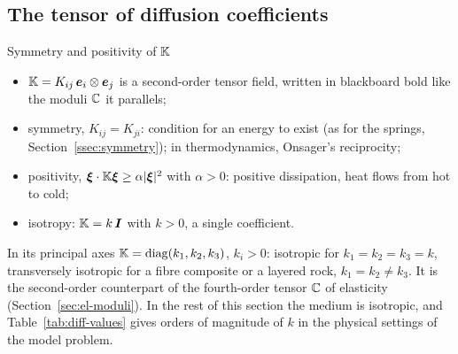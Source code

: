 \subsection{The tensor of diffusion coefficients}
%
\begin{gbox}{Symmetry and positivity of $\mathbb{K}$}
\begin{itemize}
  \item $\mathbb{K}=K_{ij}\,\bm{e}_i\otimes\bm{e}_j$ is a second-order tensor field,
  written in blackboard bold like the moduli $\mathbb{C}$ it parallels;
  \item symmetry, $K_{ij}=K_{ji}$: condition for an energy to exist (as for the
  springs, Section~\ref{ssec:symmetry}); in thermodynamics, Onsager's
  reciprocity;
  \item positivity, $\bm{\xi}\cdot\mathbb{K}\bm{\xi}\ge\alpha|\bm{\xi}|^2$ with $\alpha>0$: positive
  dissipation, heat flows from hot to cold;
  \item isotropy: $\mathbb{K}=k\,\bm{I}$ with $k>0$, a single coefficient.
\end{itemize}
\end{gbox}
In its principal axes $\mathbb{K}=\operatorname{diag}(k_1,k_2,k_3)$, $k_i>0$: isotropic for
$k_1=k_2=k_3=k$, transversely isotropic for a fibre composite or a layered
rock, $k_1=k_2\neq k_3$. It is the second-order counterpart of the fourth-order
tensor $\mathbb{C}$ of elasticity (Section~\ref{sec:el-moduli}). In the rest of this
section the medium is isotropic, and Table~\ref{tab:diff-values} gives orders
of magnitude of $k$ in the physical settings of the model problem.

